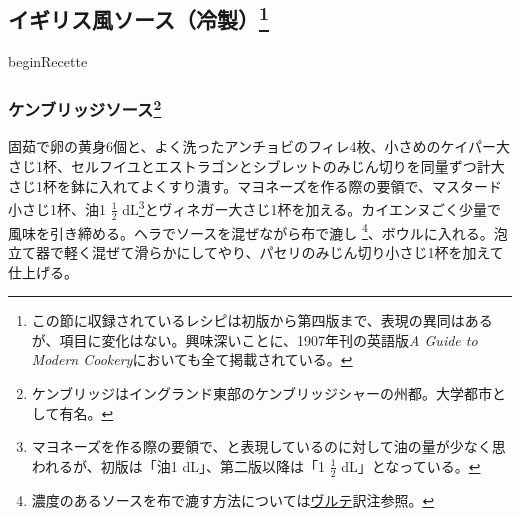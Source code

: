 \begin{recette}
{\subsection[イギリス風ソース（冷製）]{\texorpdfstring{イギリス風ソース（冷製）\footnote{この節に収録されているレシピは初版から第四版まで、表現の異同はあるが、項目に変化はない。興味深いことに、1907年刊の英語版\emph{A
  Guide to Modern Cookery}においても全て掲載されている。}}{イギリス風ソース（冷製）}}\label{sauces-froides-anglaises}}


beginRecette


\hypertarget{cambridge-sauce}{%
\subsubsection[ケンブリッジソース]{\texorpdfstring{ケンブリッジソース\footnote{ケンブリッジはイングランド東部のケンブリッジシャーの州都。大学都市として有名。}}{ケンブリッジソース}}\label{cambridge-sauce}}


 

固茹で卵の黄身6個と、よく洗ったアンチョビのフィレ4枚、小さめのケイパー大さじ1杯、セルフイユとエストラゴンとシブレットのみじん切りを同量ずつ計大さじ1杯を鉢に入れてよくすり潰す。マヨネーズを作る際の要領で、マスタード小さじ1杯、油1
\(\frac{1}{2}\) dL\footnote{マヨネーズを作る際の要領で、と表現しているのに対して油の量が少なく思われるが、初版は「油1
  dL」、第二版以降は「1 \(\frac{1}{2}\) dL」となっている。}とヴィネガー大さじ1杯を加える。カイエンヌごく少量で風味を引き締める。ヘラでソースを混ぜながら布で漉し
\footnote{濃度のあるソースを布で漉す方法については\protect\hyperlink{veloute}{ヴルテ}訳注参照。}、ボウルに入れる。泡立て器で軽く混ぜて滑らかにしてやり、パセリのみじん切り小さじ1杯を加えて仕上げる。


\end{recette}

